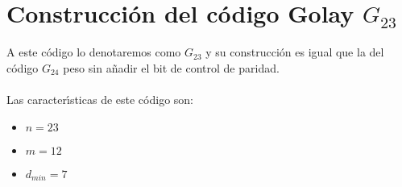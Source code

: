 %
%

\section{Construcci\'on del c\'odigo Golay $G_{23}$}

A este c\'odigo lo denotaremos como $G_{23}$ y su construcci\'on es igual
que la del c\'odigo $G_{24}$ peso sin a\~nadir el bit de control de paridad.\\ \\
%
Las caracter\'{\i}sticas de este c\'odigo son:
\begin{itemize}
\item $n=23$ 
\item $m=12$
\item $d_{min}=7$
\end{itemize}
